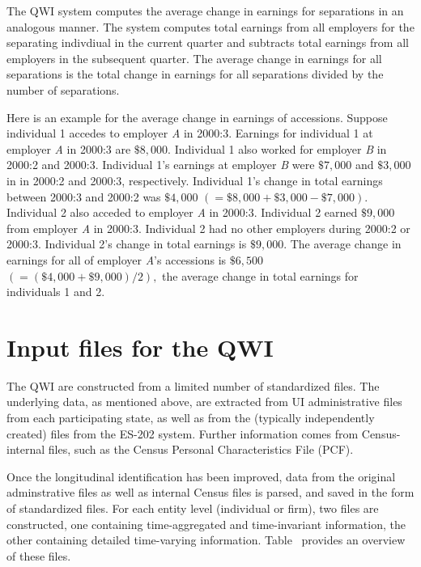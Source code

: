 The QWI system computes the average change in earnings for separations in an
analogous manner. The system computes total earnings from all employers for
the separating indivdiual in the current quarter and subtracts total
earnings from all employers in the subsequent quarter. The average change in
earnings for all separations is the total change in earnings for all
separations divided by the number of separations.

Here is an example for the average change in earnings of accessions. Suppose
individual 1 accedes to employer \textit{A} in 2000:3. Earnings for
individual 1 at employer \textit{A} in 2000:3 are $\$8,000$. Individual 1
also worked for employer \textit{B} in 2000:2 and 2000:3. Individual 1's
earnings at employer \textit{B} were $\$7,000$ and $\$3,000$ in in 2000:2
and 2000:3, respectively. Individual 1's change in total earnings between
2000:3 and 2000:2 was $\$4,000$ $\left( =\$8,000+\$3,000-\$7,000\right) .$
Individual 2 also acceded to employer \textit{A} in 2000:3. Individual 2
earned $\$9,000$ from employer \textit{A} in 2000:3. Individual 2 had no
other employers during 2000:2 or 2000:3. Individual 2's change in total
earnings is $\$9,000.$ The average change in earnings for all of employer 
\textit{A}'s accessions is $\$6,500$ $\left( =\left( \$4,000+\$9,000\right)
/2\right) ,$ the average change in total earnings for individuals 1 and 2.


\section{Input files for the QWI}
\label{sec:input_files}

The QWI are constructed from a limited
number of standardized files. The underlying data, as mentioned above, are
extracted from UI administrative files from each participating state, as
well as from the (typically independently created) files from the ES-202
system. Further information comes from Census-internal files, such as the
Census Personal Characteristics File (PCF). 

Once the longitudinal identification has been improved, data from the
original adminstrative files as well as  internal Census files
is parsed, and saved in the form of standardized
files. For each entity level (individual or firm), two files are
constructed, one containing time-aggregated and time-invariant information,
the other containing detailed time-varying information.%
%
%
%
Table~ provides an overview of these
files. 

